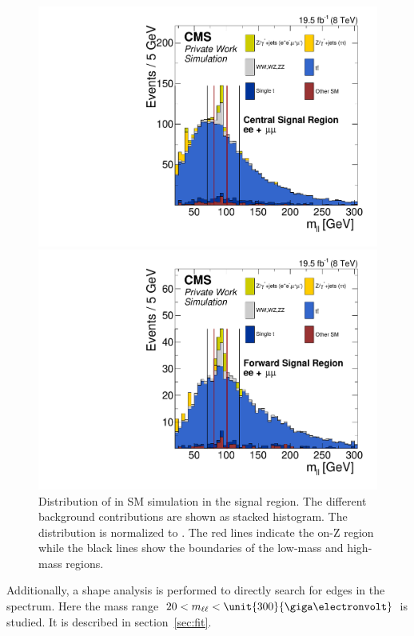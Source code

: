 \begin{figure}[htbp]
\centering
\begin{minipage}[t]{0.49\textwidth}
  \includegraphics[width=\textwidth]{plots/SELECTION/SignalCentral_Mll_Full2012_SF_TopReweighted_MCOnly.pdf}
\end{minipage}
\begin{minipage}[t]{0.49\textwidth}
\includegraphics[width=\textwidth]{plots/SELECTION/SignalForward_Mll_Full2012_SF_TopReweighted_MCOnly.pdf}
\end{minipage}
\caption{Distribution of \mll in SM simulation in the signal region. The different background contributions are shown as stacked histogram. The distribution is normalized to \lumi. The red lines indicate the on-Z region while the black lines show the boundaries of the low-mass and high-mass regions.}
\label{fig:sigMC}
\end{figure}

Additionally, a shape analysis is performed to directly search for edges in the \mll spectrum. Here the mass range $\mathrm{20}< \mll < \unit{300}{\giga\electronvolt}$ is studied. It is described in section~\ref{sec:fit}.

